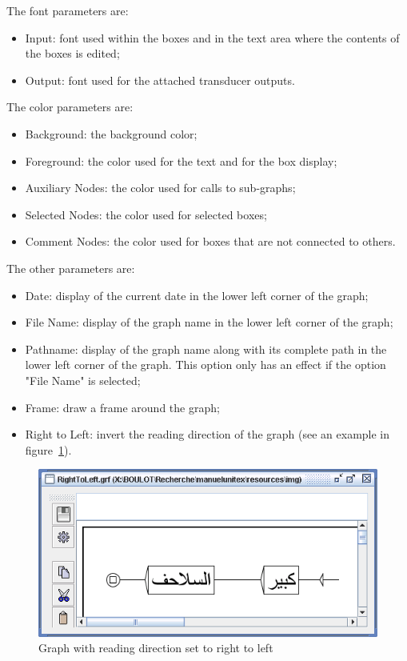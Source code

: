 \bigskip
\noindent The font parameters are:
\begin{itemize}
  \item Input: font used within the boxes and in the text area where the
  contents of the boxes is edited;
  
  \item Output: font used for the attached transducer outputs.
\end{itemize}

\bigskip
\noindent The color parameters are:
\begin{itemize}
  \item Background: the background color;
  \item Foreground: the color used for the text and for the box display;
  \item Auxiliary Nodes: the color used for calls to sub-graphs;
  \item Selected Nodes: the color used for selected boxes;
  \item Comment Nodes: the color used for boxes that are not connected to others.
\end{itemize}

\bigskip
\noindent The other parameters are:
\begin{itemize}
  \item Date: display of the current date in the lower left corner of the graph;
  \item File Name: display of the graph name in the lower left corner of the graph;
  \item Pathname: display of the graph name along with its complete path in the
  lower left corner of the graph. This option only has an effect if the option
  "File Name" is selected;
  \item Frame: draw a frame around the graph;
  \item Right to Left: invert the reading direction of the graph (see an example
  in figure~\ref{fig-right-to-left-graph}).
\end{itemize}

\bigskip
\begin{figure}[!h]
\begin{center}
\includegraphics[width=14.5cm]{resources/img/fig5-27.png}
\caption{Graph with reading direction set to right to left\label{fig-right-to-left-graph}}
\end{center}
\end{figure}

